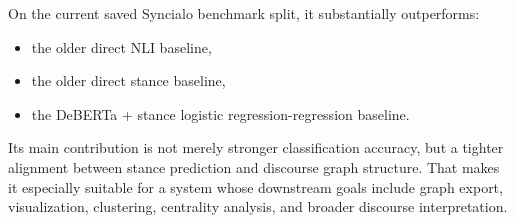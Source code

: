 \documentclass[11pt,a4paper]{article}
\begin{document}
On the current saved Syncialo benchmark split, it substantially outperforms:
\begin{itemize}[leftmargin=1.5em]
  \item the older direct NLI baseline,
  \item the older direct stance baseline,
  \item the DeBERTa + stance logistic regression-regression baseline.
\end{itemize}

Its main contribution is not merely stronger classification accuracy, but a tighter alignment between stance prediction and discourse graph structure. That makes it especially suitable for a system whose downstream goals include graph export, visualization, clustering, centrality analysis, and broader discourse interpretation.
\end{document}
